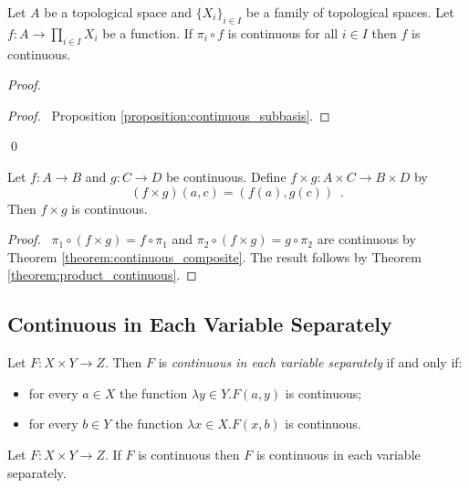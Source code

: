 \begin{theorem}
    \label{theorem:product_continuous}
        Let $A$ be a topological space and $\{ X_i \}_{i \in I}$ be a family of topological spaces. Let $f : A \rightarrow \prod_{i \in I} X_i$ be a function.
        If $\pi_i \circ f$ is continuous for all $i \in I$ then $f$ is continuous.
\end{theorem}

\begin{proof}
    \pf
    \qedstep
    \begin{proof}
        \pf\ Proposition \ref{proposition:continuous_subbasis}.
    \end{proof}
    \qed
\end{proof}

\begin{proposition}
    Let $f : A \rightarrow B$ and $g : C \rightarrow D$ be continuous. Define $f \times g : A \times C \rightarrow B \times D$ by
    \[ (f \times g)(a,c) = (f(a), g(c)) \enspace . \]
    Then $f \times g$ is continuous.
\end{proposition}

\begin{proof}
    \pf\ $\pi_1 \circ (f \times g) = f \circ \pi_1$ and $\pi_2 \circ (f \times g) = g \circ \pi_2$ are continuous
    by Theorem \ref{theorem:continuous_composite}. The result follows by Theorem \ref{theorem:product_continuous}.
\end{proof}

\subsection{Continuous in Each Variable Separately}

\begin{definition}
    Let $F : X \times Y \rightarrow Z$. Then $F$ is \emph{continuous in each
    variable separately} if and only if:
    \begin{itemize}
        \item for every $a \in X$ the function $\lambda y \in Y. F(a,y)$ is continuous;
        \item for every $b \in Y$ the function $\lambda x \in X. F(x,b)$ is continuous.
    \end{itemize}
\end{definition}

\begin{proposition}
    Let $F : X \times Y \rightarrow Z$. If $F$ is continuous then $F$ is continuous in each
    variable separately.
\end{proposition}

